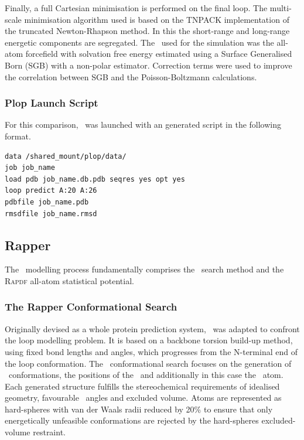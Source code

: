 Finally, a full Cartesian minimisation is performed on the final loop. The multi-scale minimisation algorithm used is based on the TNPACK implementation\cite{METHOD:MINIM:Xie1999,METHOD:MINIM:Schlick1987,METHOD:MINIM:Schlick1992} of the truncated Newton-Rhapson method. In this the short-range and long-range energetic components are segregated. The \forcefield\ used for the simulation was the all-atom \opls\cite{COMPCHEM:OPLS,COMPCHEM:OPLS:B} forcefield with solvation free energy estimated using a Surface Generalised Born (SGB) with a non-polar estimator\cite{FORCEFIELD:SGB:NP}. Correction terms were used to improve the correlation between SGB and the Poisson-Boltzmann calculations\cite{FORCEFIELD:SGB}.

\subsubsection{Plop Launch Script}

For this comparison, \plop\ was launched with an generated script in the following format.

\begin{lstlisting}[caption={The \plop\ launch script: job\_\,name.inp.}, label=listing:methcomp:plop] 
data /shared_mount/plop/data/
job job_name
load pdb job_name.db.pdb seqres yes opt yes
loop predict A:20 A:26
pdbfile job_name.pdb
rmsdfile job_name.rmsd
\end{lstlisting}


\subsection{Rapper}
\label{section:methcomp:rapper_intro}

The \rapper\ modelling process fundamentally comprises  the \rapper\ search method\cite{METHOD:RapperB} and the  \textsc{Rapdf} all-atom statistical potential\cite{METHOD:RapperA}.

\subsubsection{The Rapper Conformational Search}

Originally devised as a whole protein prediction system, \rapper\ was adapted to confront the loop modelling problem. It is based on a backbone torsion build-up method, using fixed bond lengths and angles, which progresses from the N-terminal
end of the loop conformation. The \rapper\ conformational search focuses on the generation of \mainchain\
conformations, \ie the positions of the \bbatoms\ and additionally in this
case the \cb\ atom. Each generated structure fulfills the stereochemical requirements of idealised geometry, favourable \phipsi\ angles and excluded volume. Atoms are represented as hard-spheres with van der
Waals radii reduced by 20\% to ensure that only energetically unfeasible conformations are rejected by the hard-spheres excluded-volume
restraint.

